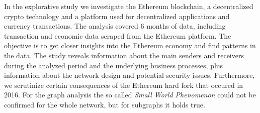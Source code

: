 In the explorative study we investigate the Ethereum blockchain,  a decentralized crypto technology and a platform used for decentralized applications and currency transactions. 
The analysis covered 6 months of data, including transaction and economic data scraped from the Ethereum platform. 
The objective is to get closer insights into the Ethereum economy and find patterns in the data.
The study reveals information about the main senders and receivers during the analyzed period and the underlying business processes, plus information about the network design and potential security issues. 
Furthermore, we scrutinize certain consequences of the Ethereum hard fork that occured in 2016.
For the graph analysis the so called \emph{Small World Phenomenon} could not be confirmed for the whole network, but for subgraphs it holds true.